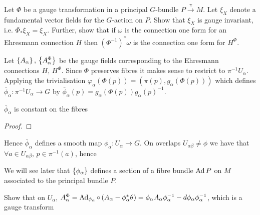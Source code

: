 \documentclass{article}
\begin{document}
\begin{ex}
Let $\Phi$ be a gauge transformation in a principal $G$-bundle $P\overset{\pi}{\to}M$. Let $\xi_X$ denote a fundamental vector fields for the $G$-action on $P$. Show that $\xi_X$ is gauge invariant, i.e. $\Phi_\ast \xi_X = \xi_X$. Further, show that if $\omega$ is the connection one form for an Ehresmann connection $H$ then $(\Phi^{-1})^\ast \omega$ is the connection one form for $H^\Phi$. 
\end{ex}

Let $\left\{ A_\alpha \right\}, \, \left\{ A_\alpha^\Phi \right\}$ be the gauge fields corresponding to the Ehresmann connections $H, \, H^\Phi$. Since $\Phi$ preserves fibres it makes sense to restrict to $\pi^{-1}U_\alpha$. Applying the trivialisation $\varphi_\alpha(\Phi(p)) = (\pi(p),g_\alpha(\Phi(p)))$ which defines $\bar{\phi}_\alpha : \pi^{-1} U_\alpha \to G$ by $\bar{\phi}_\alpha(p)=g_\alpha(\Phi(p))g_\alpha(p)^{-1}$. \\

\begin{lemma}
$\bar{\phi}_\alpha$ is constant on the fibres
\end{lemma}
\begin{proof}
\end{proof}
Hence $\bar{\phi}_\alpha$ defines a smooth map $\phi_\alpha:U_\alpha \to G$. On overlaps $U_{\alpha\beta}\neq \phi$ we have that $\forall a \in U_{\alpha\beta}, \, p \in \pi^{-1}(a)$, hence 

\begin{remark}
We will see later that $\left\{ \phi_\alpha \right\}$ defines a section of a fibre bundle $\operatorname{Ad} P$ on $M$ associated to the principal bundle $P$. 
\end{remark}

\begin{ex}
Show that on $U_\alpha$, $A_\alpha^\Phi = \operatorname{Ad}_{\phi_\alpha} \circ\left( A_\alpha - \phi_\alpha^\ast \theta \right) = \phi_\alpha A_\alpha \phi_\alpha^{-1} - d\phi_\alpha \phi_\alpha^{-1}$, which is a gauge transform
\end{ex}
\end{document}
